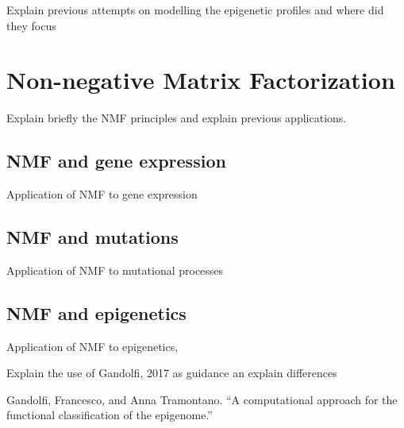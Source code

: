 Explain previous attempts on modelling the epigenetic profiles and where did they focus


\section{Non-negative Matrix Factorization}

Explain briefly the NMF principles and explain previous applications.

\subsection{NMF and gene expression}

Application of NMF to gene expression

\subsection{NMF and mutations}

Application of NMF to mutational processes

\subsection{NMF and epigenetics}

Application of NMF to epigenetics,

Explain the use of Gandolfi, 2017 as guidance an explain differences

Gandolfi, Francesco, and Anna Tramontano. ``A computational approach for the functional classification of the epigenome.''
